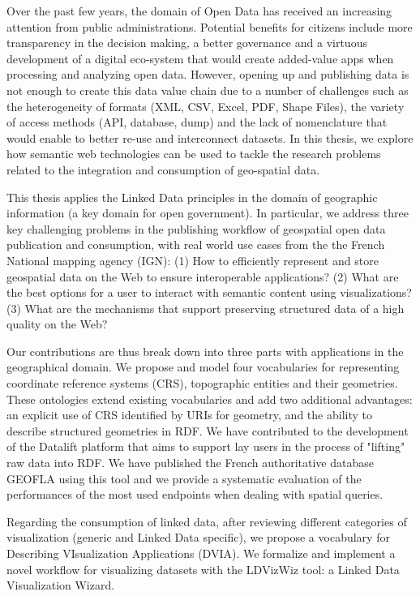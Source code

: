 Over the past few years, the domain of Open Data has received an increasing attention from public administrations. Potential benefits for citizens include more transparency in the decision making, a better governance and a virtuous development of a digital eco-system that would create added-value apps when processing and analyzing open data. However, opening up and publishing data is not enough to create this data value chain due to a number of challenges such as the heterogeneity of formats (XML, CSV, Excel, PDF, Shape Files), the variety of access methods (API, database, dump) and the lack of nomenclature that would enable to better re-use and interconnect datasets. In this thesis, we explore how semantic web technologies can be used to tackle the research problems related to the integration and consumption of geo-spatial data.

This thesis applies the Linked Data principles in the domain of geographic information (a key domain for open government). In particular, we address three key challenging problems in the publishing workflow of geospatial open data publication and consumption, with real world use cases from the the French National mapping agency (IGN): (1) How to efficiently represent and store geospatial data on the Web to ensure interoperable applications? (2) What are the best options for a user to interact with semantic content using visualizations? (3) What are the mechanisms that support preserving structured data of a high quality on the Web?

Our contributions are thus break down into three parts with applications in the geographical domain. We propose and model four vocabularies for representing coordinate reference systems (CRS), topographic entities and their geometries. These ontologies extend existing vocabularies and add two additional advantages: an explicit use of CRS identified by URIs for geometry, and the ability to describe structured geometries in RDF. We have contributed to the development of the Datalift platform that aims to support lay users in the process of "lifting" raw data into RDF. We have published the French authoritative database GEOFLA using this tool and we provide a systematic evaluation of the performances of the most used endpoints when dealing with spatial queries.

Regarding the consumption of linked data, after reviewing different categories of visualization (generic and Linked Data specific), we propose a vocabulary for Describing VIsualization Applications (DVIA). We formalize and implement a novel workflow for visualizing datasets with the LDVizWiz tool: a Linked Data Visualization Wizard.

